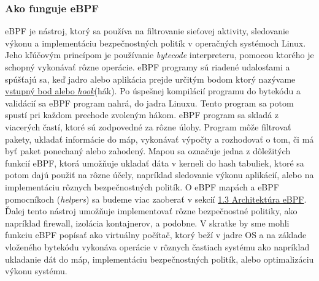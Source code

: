 \subsubsection{Ako funguje eBPF} 
eBPF je nástroj, ktorý sa používa na filtrovanie sieťovej aktivity, sledovanie výkonu a implementáciu bezpečnostných politík v operačných systémoch Linux. 
Jeho kľúčovým princípom je používanie \emph{bytecode} interpreteru, pomocou ktorého je schopný vykonávať rôzne operácie. eBPF programy sú riadené udalosťami a 
spúšťajú sa, keď jadro alebo aplikácia prejde určitým bodom ktorý nazývame \hyperref[sec:hooks]{ vstupný bod alebo \emph{hook}}(hák).  Po úspešnej kompilácií 
programu do bytekódu a validácií sa eBPF program nahrá, do jadra Linuxu. Tento program sa potom spustí pri každom prechode zvoleným hákom. 
eBPF program sa skladá z viacerých častí, ktoré sú zodpovedné za rôzne úlohy. Program môže filtrovať pakety, ukladať informácie do máp, vykonávať výpočty 
a rozhodovať o tom, či má byť paket ponechaný alebo zahodený. Mapou sa označuje jedna z dôležitých funkcií eBPF, ktorá umožňuje ukladať dáta v kerneli 
do hash tabuliek, ktoré sa potom dajú použiť na rôzne účely, napríklad sledovanie výkonu aplikácií, alebo na implementáciu rôznych bezpečnostných politík. 
O eBPF mapách a eBPF pomocníkoch (\emph{helpers}) sa budeme viac zaoberať v sekcií \hyperref[sec:architecture]{1.3 Architektúra eBPF}. 
Ďalej tento nástroj umožňuje implementovať rôzne bezpečnostné politiky, ako napríklad firewall, izolácia kontajnerov, a podobne. V skratke by sme mohli 
funkciu eBPF popísať ako virtuálny počítač, ktorý beží v jadre OS a na základe vloženého bytekódu vykonáva operácie v rôznych častiach systému ako 
napríklad ukladanie dát do máp, implementáciu bezpečnostných politík, alebo optimalizáciu výkonu systému.

